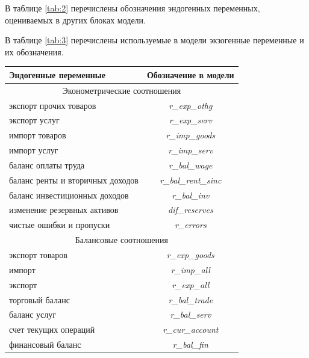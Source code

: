 \documentclass[a4paper, 14pt]{extarticle}
\begin{document}
В таблице \ref{tab:2} перечислены обозначения эндогенных переменных, оцениваемых в других блоках модели.

В таблице \ref{tab:3} перечислены используемые в модели экзогенные переменные и их обозначения.


\begin{center}
	\small
	\begin{tabular}{ l | c }
		\toprule
		Эндогенные переменные  & Обозначение в модели  \\
		\midrule
		\multicolumn{2}{c}{Эконометрические соотношения}\\
		\midrule 
		экспорт прочих товаров & \textit{ r\_exp\_othg } \\
		экспорт услуг & \textit{ r\_exp\_serv } \\
		импорт товаров &  \textit{ r\_imp\_goods } \\  
		импорт услуг &  \textit{ r\_imp\_serv } \\  
		баланс оплаты труда &  \textit{ r\_bal\_wage } \\  
		баланс ренты и вторичных доходов &  \textit{ r\_bal\_rent\_sinc } \\ 
		баланс инвестиционных доходов &  \textit{ r\_bal\_inv } \\
		изменение резервных активов &  \textit{ dif\_reserves } \\
		чистые ошибки и пропуски &  \textit{ r\_errors } \\
		\midrule
		\multicolumn{2}{c}{Балансовые соотношения}\\
		\midrule
		экспорт товаров & \textit{ r\_exp\_goods } \\
		импорт  &  \textit{ r\_imp\_all } \\  
		экспорт  &  \textit{ r\_exp\_all } \\  
		торговый баланс  &  \textit{ r\_bal\_trade } \\
		баланс услуг  &  \textit{ r\_bal\_serv } \\
		счет текущих операций  &  \textit{ r\_cur\_account } \\
		финансовый баланс  &  \textit{ r\_bal\_fin } \\
		\bottomrule
	\end{tabular}
\normalsize
{}\label{tab:1}
\end{center}
\end{document}
